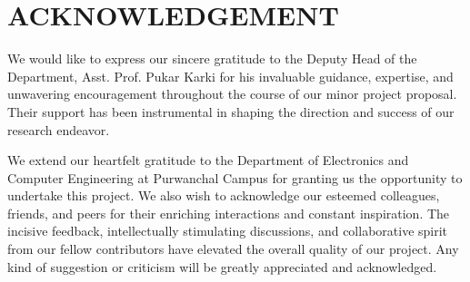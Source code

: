 \chapter*{ACKNOWLEDGEMENT}
We would like to express our sincere gratitude to the Deputy Head of the Department, Asst. Prof. Pukar Karki for his invaluable guidance, expertise, and unwavering encouragement throughout the course of our minor project proposal. Their support has been instrumental in shaping the direction and success of our research endeavor. 

 We extend our heartfelt gratitude to the Department of Electronics and Computer Engineering at Purwanchal Campus for granting us the opportunity to undertake this project. We also wish to acknowledge our esteemed colleagues, friends, and peers for their enriching interactions and constant inspiration. The incisive feedback, intellectually stimulating discussions, and collaborative spirit from our fellow contributors have elevated the overall quality of our project. 
 Any kind of suggestion or criticism will be greatly appreciated and acknowledged.

\vspace{1cm}



